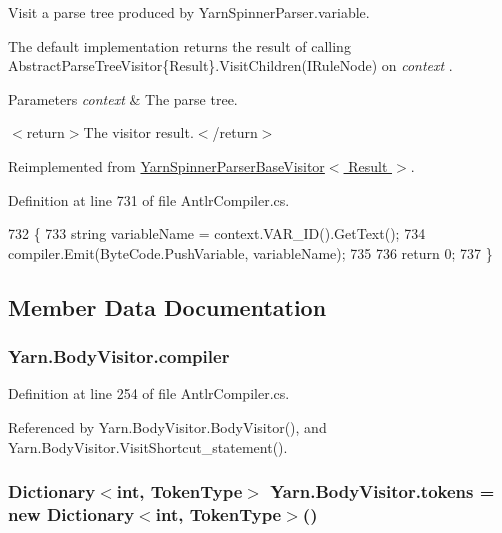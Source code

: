 Visit a parse tree produced by Yarn\-Spinner\-Parser.\-variable. 

The default implementation returns the result of calling Abstract\-Parse\-Tree\-Visitor\{\-Result\}.\-Visit\-Children(\-I\-Rule\-Node) on {\itshape context} . 


\begin{DoxyParams}{Parameters}
{\em context} & The parse tree.\\
\hline
\end{DoxyParams}
$<$return$>$The visitor result.$<$/return$>$ 

Reimplemented from \hyperlink{a00197_a51d3d21fc833b5b4676ac84a46cdef87}{Yarn\-Spinner\-Parser\-Base\-Visitor$<$ Result $>$}.



Definition at line 731 of file Antlr\-Compiler.\-cs.


\begin{DoxyCode}
732         \{
733             \textcolor{keywordtype}{string} variableName = context.VAR\_ID().GetText();
734             compiler.Emit(ByteCode.PushVariable, variableName);
735 
736             \textcolor{keywordflow}{return} 0;
737         \}
\end{DoxyCode}


\subsection{Member Data Documentation}
\hypertarget{a00044_a39d71c6de5e1c9f7d2f78ac2ccd5743d}{
\subsubsection[{compiler}]{ Yarn.\-Body\-Visitor.\-compiler\hspace{0.3cm}{\ttfamily [package]}}}\label{a00044_a39d71c6de5e1c9f7d2f78ac2ccd5743d}


Definition at line 254 of file Antlr\-Compiler.\-cs.



Referenced by Yarn.\-Body\-Visitor.\-Body\-Visitor(), and Yarn.\-Body\-Visitor.\-Visit\-Shortcut\-\_\-statement().

\hypertarget{a00044_ab8aa4dbe47a807e3d973df2b85e3fffc}{
\subsubsection[{tokens}]{\setlength{\rightskip}{0pt plus 5cm}Dictionary$<$int, {\bf Token\-Type}$>$ Yarn.\-Body\-Visitor.\-tokens = new Dictionary$<$int, {\bf Token\-Type}$>$()\hspace{0.3cm}{\ttfamily [private]}}}\label{a00044_ab8aa4dbe47a807e3d973df2b85e3fffc}


